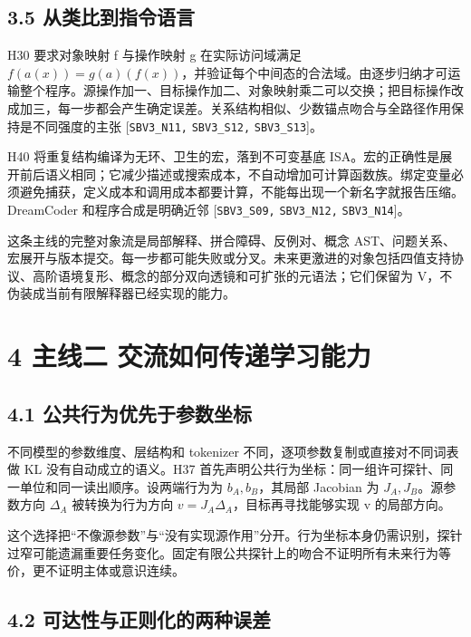 \documentclass[
  10pt,
]{article}
\begin{document}
\subsection{3.5
从类比到指令语言}\label{ux4eceux7c7bux6bd4ux5230ux6307ux4ee4ux8bedux8a00}

H30 要求对象映射 f 与操作映射 g 在实际访问域满足
\(f(a(x))=g(a)(f(x))\)，并验证每个中间态的合法域。由逐步归纳才可运输整个程序。源操作加一、目标操作加二、对象映射乘二可以交换；把目标操作改成加三，每一步都会产生确定误差。关系结构相似、少数锚点吻合与全路径作用保持是不同强度的主张
{[}\nolinkurl{SBV3_N11,} \nolinkurl{SBV3_S12,} \nolinkurl{SBV3_S13}{]}。

H40 将重复结构编译为无环、卫生的宏，落到不可变基底
ISA。宏的正确性是展开前后语义相同；它减少描述或搜索成本，不自动增加可计算函数族。绑定变量必须避免捕获，定义成本和调用成本都要计算，不能每出现一个新名字就报告压缩。DreamCoder
和程序合成是明确近邻 {[}\nolinkurl{SBV3_S09,} \nolinkurl{SBV3_N12,}
\nolinkurl{SBV3_N14}{]}。

这条主线的完整对象流是局部解释、拼合障碍、反例对、概念
AST、问题关系、宏展开与版本提交。每一步都可能失败或分叉。未来更激进的对象包括四值支持协议、高阶语境复形、概念的部分双向透镜和可扩张的元语法；它们保留为
V，不伪装成当前有限解释器已经实现的能力。

\section{4 主线二
交流如何传递学习能力}\label{ux4e3bux7ebfux4e8c-ux4ea4ux6d41ux5982ux4f55ux4f20ux9012ux5b66ux4e60ux80fdux529b}

\subsection{4.1
公共行为优先于参数坐标}\label{ux516cux5171ux884cux4e3aux4f18ux5148ux4e8eux53c2ux6570ux5750ux6807}

不同模型的参数维度、层结构和 tokenizer
不同，逐项参数复制或直接对不同词表做 KL 没有自动成立的语义。H37
首先声明公共行为坐标：同一组许可探针、同一单位和同一读出顺序。设两端行为为
\(b_A,b_B\)，其局部 Jacobian 为 \(J_A,J_B\)。源参数方向 \(\Delta_A\)
被转换为行为方向 \(v=J_A\Delta_A\)，目标再寻找能够实现 v 的局部方向。

这个选择把``不像源参数''与``没有实现源作用''分开。行为坐标本身仍需识别，探针过窄可能遗漏重要任务变化。固定有限公共探针上的吻合不证明所有未来行为等价，更不证明主体或意识连续。

\subsection{4.2
可达性与正则化的两种误差}\label{ux53efux8fbeux6027ux4e0eux6b63ux5219ux5316ux7684ux4e24ux79cdux8befux5dee}
\end{document}
